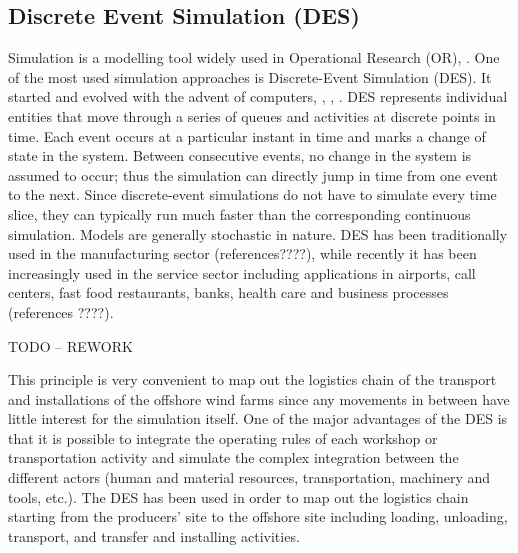 \subsection{Discrete Event Simulation (DES)}
Simulation is a modelling tool widely used in Operational Research (OR), \cite{pidd2005computer}. One of the most used simulation approaches is Discrete-Event Simulation (DES). It started and evolved with the advent of computers, \cite{Myron1987}, \cite {William1988}, \cite{robinson2005}. DES represents individual entities that move through a series of queues and activities at discrete points in time. Each event occurs at a particular instant in time and marks a change of state in the system. Between consecutive events, no change in the system is assumed to occur; thus the simulation can directly jump in time from one event to the next. Since discrete-event simulations do not have to simulate every time slice, they can typically run much faster than the corresponding continuous simulation. Models are generally stochastic in nature. DES has been traditionally used in the manufacturing sector \cite{KhedriLiraviasl20151490} (references????), while recently it has been increasingly used in the service sector including applications in airports, call centers, fast food restaurants, banks, health care \cite{Chemweno201445} and business processes (references ????).

TODO -- REWORK


This principle is very convenient to map out the logistics chain of the transport and installations of the offshore wind farms since any movements in between have little interest for the simulation itself. One of the major advantages of the DES is that it is possible to integrate the operating rules of each workshop or transportation activity and simulate the complex integration between the different actors (human and material resources, transportation, machinery and tools, etc.).  
The DES has been used in order to map out the logistics chain starting from the producers’ site to the offshore site including loading, unloading, transport, and transfer and installing activities.
